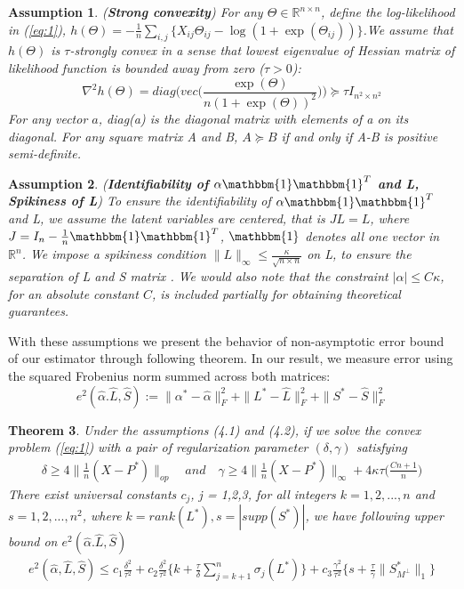 \documentclass{article}
\newtheorem{theorem}{Theorem}[section]
\newtheorem{assumption}[theorem]{Assumption}
\begin{document}
\begin{assumption} (\textbf{Strong convexity})
For any $\Theta \in \mathbb{R}^{n\times n}$, define the log-likelihood in (\ref{eq:1}), $h(\Theta) = -\frac{1}{n}\sum_{i,j} \big\{ X_{ij}\Theta_{ij} - \log(1+\exp(\Theta_{ij})) \big\}$.We assume that $h(\Theta)$ is $\tau$-strongly convex in a sense that lowest eigenvalue of Hessian matrix of likelihood function is bounded away from zero ($\tau > 0$):
\[
\nabla^{2}h(\Theta) = diag\Big(vec\Big(\frac{\exp(\Theta)}{n(1+\exp(\Theta))^{2}}
\Big)\Big) \succcurlyeq \tau I_{n^{2} \times n^{2}}
\]
For any vector $a$, diag(a) is the diagonal matrix with elements of a on its diagonal. For any square matrix A and B, $ A \succcurlyeq B $ if and only if A-B is positive semi-definite.
\end{assumption}

\begin{assumption} (\textbf{Identifiability of $\alpha\mathbbm{1}\mathbbm{1}^T$ and L, Spikiness of L})
To ensure the identifiability of $\alpha\mathbbm{1}\mathbbm{1}^T$ and L, we assume the latent variables are centered, that is $JL=L$, where $J=I_{n}-\frac{1}{n}\mathbbm{1}\mathbbm{1}^T$, $\mathbbm{1}$ denotes all one vector in $\mathbb{R}^{n}$. We impose a spikiness condition $\|L\|_{\infty}\leq\frac{\kappa}{\sqrt{n \times n}}$ on L, to ensure the separation of L and S matrix \cite{agarwal2012noisy}. We would also note that the constraint $|\alpha|\leq C\kappa$, for an absolute constant $C$, is included partially for obtaining theoretical guarantees.
\end{assumption}

With these assumptions we present the behavior of non-asymptotic error bound of our estimator through following theorem. In our result, we measure error using the squared Frobenius norm summed across both matrices:
\[
    e^{2}(\hat{\alpha}.\hat{L},\hat{S}):=\|\alpha^{*}-\hat{\alpha}\|_{F}^{2} + \|L^{*}-\hat{L}\|_{F}^{2} + \|S^{*}-\hat{S}\|_{F}^{2}
\]

\begin{theorem}
Under the assumptions (4.1) and (4.2),
if we solve the convex problem (\ref{eq:1}) with a pair of regularization parameter $(\delta,\gamma)$ satisfying
\begin{align}
\delta \geq 4\|\frac{1}{n}(X-P^{*})\|_{op} \quad and \quad \gamma \geq 4\|\frac{1}{n}(X-P^{*})\|_{\infty}+4\kappa\tau\bigg(\frac{Cn+1}{n} \bigg)
\end{align}
There exist universal constants $c_{j}$, j = 1,2,3,  for all integers $k = 1,2,...,n$ and $s = 1,2,...,n^{2}$, where $k = rank(L^{*}), s= |supp(S^{*})|$, we have following upper bound on $e^{2}(\hat{\alpha}.\hat{L},\hat{S})$
\begin{align}
    e^{2}(\hat{\alpha},\hat{L},\hat{S}) \leq
    c_{1}\frac{\delta^{2}}{\tau^{2}} +
    c_{2}\frac{\delta^{2}}{\tau^{2}}
    \bigg\{k + \frac{\tau}{\delta}\sum_{j=k+1}^{n}\sigma_{j}(L^{*})\bigg\} +
    c_{3}\frac{\gamma^{2}}{\tau^{2}}
    \bigg\{s + \frac{\tau}{\gamma}\|S^*_{M^\perp}\|_{1}\bigg\}
\end{align}
\end{theorem}
\end{document}
